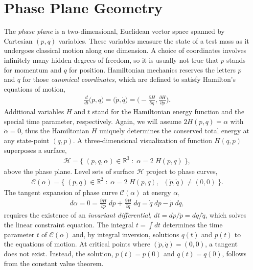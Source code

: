 \documentclass[nofootinbib,preprint]{revtex4-1}
\begin{document}



\section{Phase Plane Geometry}

The \textit{phase plane} is a two-dimensional, Euclidean vector space spanned by 
Cartesian $(p,q)$ variables. These variables measure the state of a test mass as it 
undergoes classical motion along one dimension. A choice of coordinates involves infinitely
many hidden degrees of freedom, so it is usually not true that $p$ stands for momentum and 
$q$ for position. Hamiltonian mechanics reserves the letters $p$ and $q$ for those 
\textit{canonical coordinates}, which are defined to satisfy Hamilton's equations of motion,
\begin{eqnarray}
\frac{d}{dt}\Big(p,q\Big)= \Big(\dot{p},\dot{q}\Big) 
= \bigg(-\frac{\partial H }{\partial q}, \frac{\partial H}{\partial p} \bigg). \nonumber
\end{eqnarray}
Additional variables $H$ and $t$ stand for the Hamiltonian energy function and the special
time parameter, respectively. Again, we will assume $2H(p,q)=\alpha$ 
with $\dot{\alpha} = 0$, thus the Hamiltonian $H$ uniquely determines the conserved total 
energy at any state-point $(q,p)$. A three-dimensional visualization of function $H(q,p)$ 
superposes a surface,
\begin{eqnarray}
\mathcal{H} = \{ \; (p,q,\alpha) \in \mathbb{R}^3 \; : \; \alpha = 2\;H(p,q) \; \}, \nonumber
\end{eqnarray}
above the phase plane. Level sets of surface $\mathcal{H}$ project to phase 
curves,
\begin{eqnarray}
\mathcal{C}(\alpha) = \{ \; (p,q) \in \mathbb{R}^2 \; : \; \alpha = 2\;H(p,q), \;\; (\dot{p},\dot{q})\neq(0,0) \; \}. \nonumber
\end{eqnarray}
The tangent expansion of phase curve $\mathcal{C}(\alpha)$ at energy $\alpha$, 
\begin{eqnarray}
d\alpha = 0 = \frac{\partial H}{\partial p}\;dp+\frac{\partial H}{\partial q}\;dq = \dot{q}\;dp-\dot{p}\;dq, \nonumber
\end{eqnarray}
requires the existence of an \textit{invariant differential}, $dt = dp/\dot{p} = dq/\dot{q}$,
which solves the linear constraint equation. The integral $t=\int dt$ determines the time parameter 
$t$ of $\mathcal{C}(\alpha)$ and, by integral inversion, solutions $q(t)$ and $p(t)$ to the equations of motion. 
At critical points where $(\dot{p},\dot{q})=(0,0)$, a tangent does not exist. Instead, the solution,  
$p(t)=p(0)$ and $q(t)=q(0)$, follows from the constant value theorem. 
\end{document}
